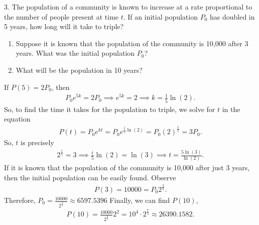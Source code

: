 \documentclass{report}
\begin{document}
    \bigbreak \noindent 
    \begin{mdframed}
        3. The population of a community is known to increase at a rate proportional to the number of people present at time $t$. If an initial population $P_{0}$ has doubled in 5 years, how long will it take to triple?
        \begin{enumerate}[label=(\alph*)]
            \item Suppose it is known that the population of the community is 10,000 after 3 years. What was the initial population $P_{0}$?
            \item What will be the population in 10 years?
        \end{enumerate}
    \end{mdframed}
    \bigbreak \noindent 
    If $P(5) = 2P_{0}$, then
    \begin{align*}
        P_{0}e^{5k} = 2P_{0} \implies e^{5k} = 2 \implies k = \frac{1}{5}\ln{\left(2\right)}
    .\end{align*}
    So, to find the time it takes for the population to triple, we solve for $t$ in the equation
    \begin{align*}
       P(t) = P_{0}e^{kt}  = P_{0}e^{\frac{t}{5}\ln{\left(2\right)}} = P_{0}\left(2\right)^{\frac{t}{5}}= 3P_{0} 
    .\end{align*}
    So, $t$ is precisely
    \begin{align*}
        2^{\frac{t}{5}}   = 3 \implies \frac{t}{5}\ln{\left(2\right)} = \ln{\left(3\right)} \implies t = \frac{5\ln{\left(3\right)}}{\ln{\left(2\right)}}
    .\end{align*}
    If it is known that the population of the community is 10,000 after just 3 years, then the initial population can be easily found. Observe
    \begin{align*}
        P(3) = 10000 = P_{0}2^{\frac{3}{5}}
    .\end{align*}
    Therefore, $P_{0} = \frac{10000}{2^{\frac{3}{5}}} \approx 6597.5396$
    \bigbreak \noindent 
    Finally, we can find $P(10)$,
    \begin{align*}
        P(10) = \frac{10000}{2^{\frac{3}{5}}}2^{2} = 10^{4} \cdot 2^{\frac{7}{5}} \approx 26390.1582
    .\end{align*}
\end{document}

